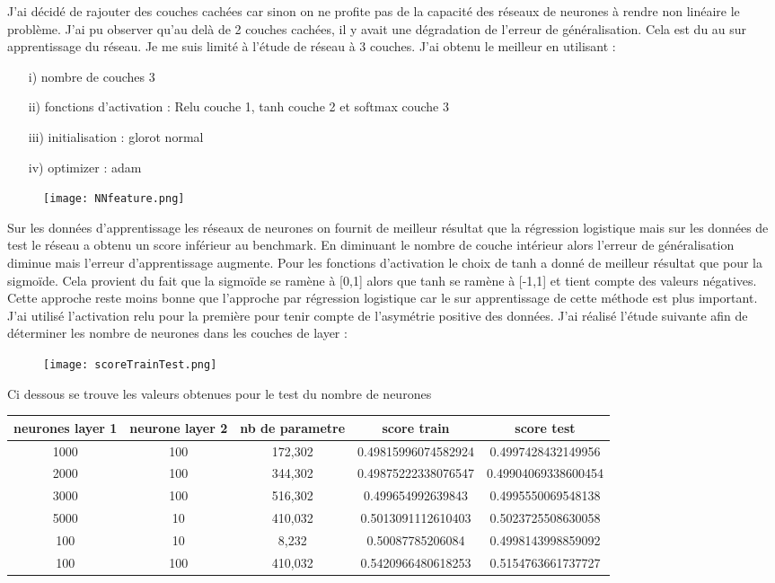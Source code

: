 \documentclass[12pt]{scrartcl} %
\begin{document}
J'ai décidé de rajouter des couches cachées car sinon on ne profite pas de la capacité des réseaux de neurones à rendre non linéaire le problème. J'ai pu observer qu'au delà de 2 couches cachées, il y avait une dégradation de l'erreur de généralisation. Cela est du au sur apprentissage du réseau. Je me suis limité à l'étude de réseau à 3 couches. J'ai obtenu le meilleur en utilisant :
\begin{itemize}
\item[i)] nombre de couches 3
\item[ii)] fonctions d'activation : Relu couche 1, tanh couche 2 et softmax couche 3 
\item[iii)]initialisation : glorot normal
\item[iv)] optimizer : adam
\end{itemize}
\begin{figure}[h]
\centering
\texttt{[image: NNfeature.png]}
\end{figure}
Sur les données d'apprentissage les réseaux de neurones on fournit de meilleur résultat que la régression logistique mais sur les données de test le réseau a obtenu un score inférieur au benchmark.
En diminuant le nombre de couche intérieur alors l'erreur de généralisation diminue mais l'erreur d'apprentissage augmente. Pour les fonctions d'activation le choix de tanh a donné de meilleur résultat que pour la sigmoïde. Cela provient du fait que la sigmoïde se ramène à [0,1] alors que tanh se ramène à [-1,1] et tient compte des valeurs négatives. Cette approche reste moins bonne que l'approche par régression logistique car le sur apprentissage de cette méthode est plus important. J'ai utilisé l'activation relu pour la première pour tenir compte de l'asymétrie positive des données.
J'ai réalisé l'étude suivante afin de déterminer les nombre de neurones dans les couches de layer : 
\begin{figure}[h!]
\centering
\texttt{[image: scoreTrainTest.png]}
\end{figure}
\newline
Ci dessous se trouve les valeurs obtenues pour le test du nombre de neurones 
\newline
\begin{table}[h]
\centering
\begin{adjustbox}{max width=\textwidth}
\begin{tabular}{|c|c|c|c|c|}
neurones layer 1 & neurone layer 2 & nb de parametre & score train & score test\\
\hline
1000 & 100 & 172,302 & 0.49815996074582924 &0.4997428432149956 \\
2000 & 100 & 344,302 & 0.49875222338076547 & 0.49904069338600454\\
3000 & 100 & 516,302 & 0.499654992639843 & 0.4995550069548138\\
5000 & 10 & 410,032 & 0.5013091112610403 & 0.5023725508630058\\
100 & 10 &   8,232 &0.50087785206084 & 0.4998143998859092\\
100 & 100 &410,032 &  0.5420966480618253 & 0.5154763661737727
\end{tabular}
\end{adjustbox}
\end{table}
\end{document}
